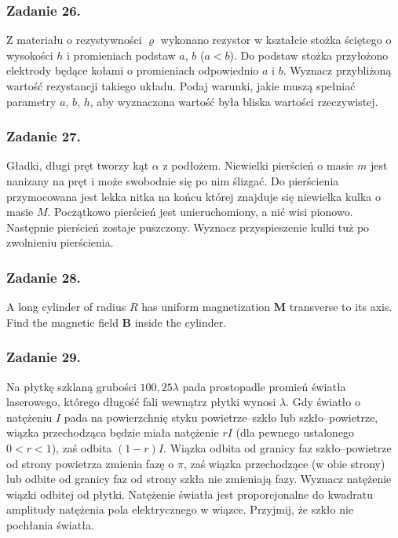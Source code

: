 \documentclass[a4paper, twocolumn]{article}
\begin{document}
\subsubsection*{Zadanie 26.}
Z materiału o rezystywności \(\varrho\) wykonano rezystor w kształcie stożka ściętego o wysokości \(h\) i promieniach podstaw \(a\), \(b\) (\(a<b\)). Do podstaw stożka przyłożono elektrody będące kołami o promieniach odpowiednio \(a\) i \(b\). Wyznacz przybliżoną wartość rezystancji takiego układu. Podaj warunki, jakie muszą spełniać parametry \(a\), \(b\), \(h\), aby wyznaczona wartość była bliska wartości rzeczywistej.

\subsubsection*{Zadanie 27.}
Gładki, długi pręt tworzy kąt \(\alpha\) z podłożem. Niewielki pierścień o masie \(m\) jest nanizany na pręt i może swobodnie się po nim ślizgać. Do pierścienia przymocowana jest lekka nitka na końcu której znajduje się niewielka kulka o masie \(M\). Początkowo pierścień jest unieruchomiony, a nić wisi pionowo. Następnie pierścień zostaje puszczony. Wyznacz przyspieszenie kulki tuż po zwolnieniu pierścienia.

\subsubsection*{Zadanie 28.}
A long cylinder of radius \(R\) has uniform magnetization \(\mathbf{M}\) transverse to its axis. Find the magnetic field \(\mathbf{B}\) inside the cylinder.

\subsubsection*{Zadanie 29.}
Na płytkę szklaną grubości \(100,25\lambda\) pada prostopadle promień światła laserowego, którego długość fali wewnątrz płytki wynosi \(\lambda\). Gdy światło o natężeniu \(I\) pada na powierzchnię styku powietrze--szkło lub szkło--powietrze, wiązka przechodząca będzie miała natężenie \(rI\) (dla pewnego ustalonego \(0<r<1\)), zaś odbita \((1-r)I\). Wiązka odbita od granicy faz szkło--powietrze od strony powietrza zmienia fazę o \(\pi\), zaś wiązka przechodzące (w obie strony) lub odbite od granicy faz od strony szkła nie zmieniają fazy. Wyznacz natężenie wiązki odbitej od płytki. Natężenie światła jest proporcjonalne do kwadratu amplitudy natężenia pola elektrycznego w wiązce. Przyjmij, że szkło nie pochłania światła.
\end{document}
